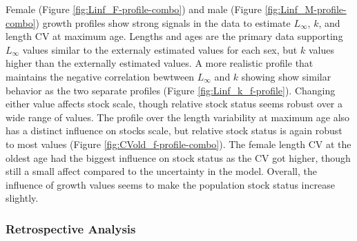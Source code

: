 \documentclass[11pt,
  english,
  a4paper,
]{article}
\begin{document}
\leavevmode\tagmcend\tagstructend\par


Female (Figure \ref{fig:Linf_F-profile-combo}) and male (Figure \ref{fig:Linf_M-profile-combo}) growth profiles show strong signals in the data to estimate {\(L_{\infty}\)\leavevmode\tagmcend\tagstructend}, {\(k\)\leavevmode\tagmcend\tagstructend}, and length CV at maximum age. Lengths and ages are the primary data supporting {\(L_{\infty}\)\leavevmode\tagmcend\tagstructend} values similar to the externaly estimated values for each sex, but {\(k\)\leavevmode\tagmcend\tagstructend} values higher than the externally estimated values. A more realistic profile that maintains the negative correlation bewtween {\(L_{\infty}\)\leavevmode\tagmcend\tagstructend} and {\(k\)\leavevmode\tagmcend\tagstructend} showing show similar behavior as the two separate profiles (Figure \ref{fig:Linf_k_f-profile}). Changing either value affects stock scale, though relative stock status seems robust over a wide range of values. The profile over the length variability at maximum age also has a distinct influence on stocks scale, but relative stock status is again robust to most values (Figure \ref{fig:CVold_f-profile-combo}). The female length CV at the oldest age had the biggest influence on stock status as the CV got higher, though still a small affect compared to the uncertainty in the model. Overall, the influence of growth values seems to make the population stock status increase slightly.

\leavevmode\tagmcend\tagstructend\par


\hypertarget{retrospective-analysis}{%
\subsubsection{Retrospective Analysis}\label{retrospective-analysis}}

\leavevmode\tagmcend\tagstructend

\end{document}
